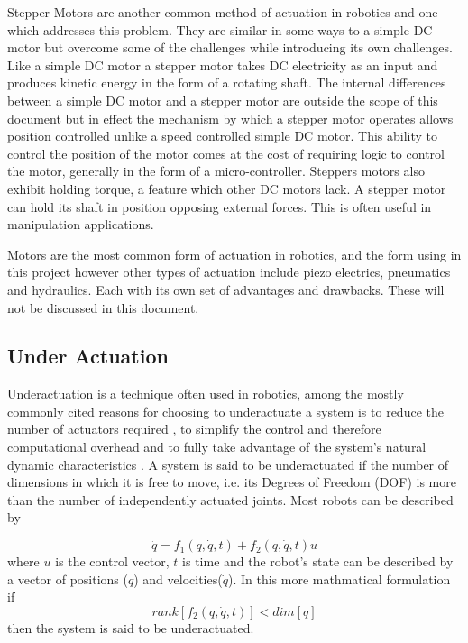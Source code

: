 Stepper Motors are another common method of actuation in robotics and one which addresses this problem. They are similar in some ways to a simple DC motor but overcome some of the challenges while introducing its own challenges. Like a simple DC motor a stepper motor takes DC electricity as an input and produces kinetic energy in the form of a rotating shaft. The internal differences between a simple DC motor and a stepper motor are outside the scope of this document but in effect the mechanism by which a stepper motor operates allows position controlled unlike a speed controlled simple DC motor. This ability to control the position of the motor comes at the cost of requiring logic to control the motor, generally in the form of a micro-controller. Steppers motors also exhibit holding torque, a feature which other DC motors lack. A stepper motor can hold its shaft in position opposing external forces. This is often useful in manipulation applications.

Motors are the most common form of actuation in robotics, and the form using in this project however other types of actuation include piezo electrics, pneumatics and hydraulics. Each with its own set of advantages and drawbacks. These will not be discussed in this document.

\subsection{Under Actuation}\label{UnderActuaction}

Underactuation is a technique often used in robotics, among the mostly commonly cited reasons for choosing to underactuate a system is to reduce the number of actuators required \cite{UnderactuationReductionInActuactors}, to simplify the control and therefore computational overhead and to fully take advantage of the system's natural dynamic characteristics \cite{PassiveDynamicWalker}. A system is said to be underactuated if the number of dimensions in which it is free to move, i.e. its Degrees of Freedom (DOF) is more than the number of independently actuated joints. Most robots can be described by 

\begin{equation}
\ddot{q} = f_1(q,\dot{q},t) + f_2(q, \dot{q},t)u   
\end{equation}
where \(u\) is the control vector, \(t\) is time and the robot's state can be described by a vector of positions (\(q\)) and velocities(\(\dot{q}\)). In this more mathmatical formulation if 
\begin{equation}
    rank[f_2(q,\dot{q},t)] < dim[q]
\end{equation}
then the system is said to be underactuated.


